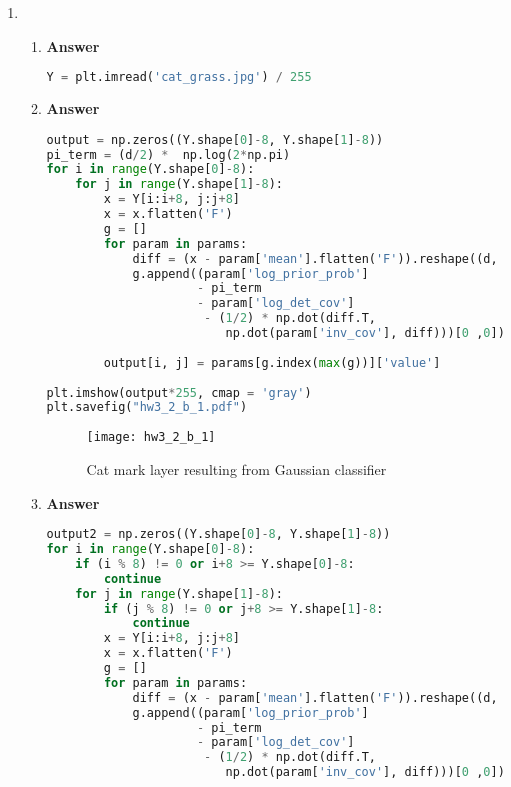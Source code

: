 \documentclass[11pt]{article}
\begin{document}
\begin{enumerate}[label=(\alph*)]
\newpage

\item

\begin{enumerate}[label=(\roman*)]

\item  \textbf{Answer}

\begin{lstlisting}[language=Python, showstringspaces=false]
Y = plt.imread('cat_grass.jpg') / 255
\end{lstlisting}

\item  \textbf{Answer}

\begin{lstlisting}[language=Python, showstringspaces=false]
output = np.zeros((Y.shape[0]-8, Y.shape[1]-8))
pi_term = (d/2) *  np.log(2*np.pi)
for i in range(Y.shape[0]-8):
    for j in range(Y.shape[1]-8):
        x = Y[i:i+8, j:j+8]
        x = x.flatten('F')
        g = []
        for param in params:
            diff = (x - param['mean'].flatten('F')).reshape((d, 1))
            g.append((param['log_prior_prob']
                     - pi_term
                     - param['log_det_cov']
                      - (1/2) * np.dot(diff.T, 
                         np.dot(param['inv_cov'], diff)))[0 ,0])       
                    
        output[i, j] = params[g.index(max(g))]['value']
        
plt.imshow(output*255, cmap = 'gray')
plt.savefig("hw3_2_b_1.pdf")
\end{lstlisting}

\begin{figure}[H]
\centering
\texttt{[image: hw3\_2\_b\_1]}
\caption{Cat mark layer resulting from Gaussian classifier}
\label{fig:hw3_2_b_1}
\end{figure}

\item  \textbf{Answer}

\begin{lstlisting}[language=Python, showstringspaces=false]
output2 = np.zeros((Y.shape[0]-8, Y.shape[1]-8))
for i in range(Y.shape[0]-8):
    if (i % 8) != 0 or i+8 >= Y.shape[0]-8:
        continue
    for j in range(Y.shape[1]-8):
        if (j % 8) != 0 or j+8 >= Y.shape[1]-8:
            continue
        x = Y[i:i+8, j:j+8]
        x = x.flatten('F')
        g = []
        for param in params:
            diff = (x - param['mean'].flatten('F')).reshape((d, 1))
            g.append((param['log_prior_prob']
                     - pi_term
                     - param['log_det_cov']
                      - (1/2) * np.dot(diff.T, 
                         np.dot(param['inv_cov'], diff)))[0 ,0])       
        

\end{lstlisting}
\end{enumerate}
\end{enumerate}
\end{document}
